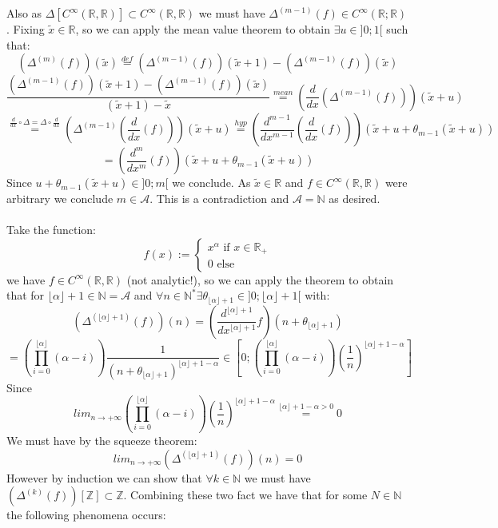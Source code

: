 \documentclass[11pt, a4paper, oneside]{article}
\theoremstyle{remark}
\theoremstyle{lemma}
\begin{document}
Also as $\Delta[C^{\infty}(\mathbb{R},\mathbb{R})]\subset C^{\infty}(\mathbb{R},\mathbb{R})$ we must have $\Delta^{(m-1)}(f)\in C^{\infty}(\mathbb{R};\mathbb{R})$. Fixing $\tilde{x}\in\mathbb{R}$, so we can apply the mean value theorem to obtain $\exists u\in ]0;1[$ such that:
$$\left(\Delta^{(m)}(f)\right)(\tilde{x})\overset{def}{=}\left(\Delta^{(m-1)}(f)\right)(\tilde{x}+1)-\left(\Delta^{(m-1)}(f)\right)(\tilde{x})$$
$$\frac{\left(\Delta^{(m-1)}(f)\right)(\tilde{x}+1)-\left(\Delta^{(m-1)}(f)\right)(\tilde{x})}{(\tilde{x}+1)-\tilde{x}}\overset{mean}{=}\left(\frac{d}{dx}\left(\Delta^{(m-1)}(f)\right)\right)(\tilde{x}+u)$$
$$\overset{\frac{d}{dx}\circ\Delta=\Delta\circ\frac{d}{dx}}{=}\left(\Delta^{(m-1)}\left(\frac{d}{dx}(f)\right)\right)(\tilde{x}+u)\overset{hyp}{=}\left(\frac{d^{m-1}}{dx^{m-1}}\left(\frac{d}{dx}(f)\right)\right)(\tilde{x}+u+\theta_{m-1}(\tilde{x}+u))$$
$$=\left(\frac{d^{m}}{dx^{m}}(f)\right)(\tilde{x}+u+\theta_{m-1}(\tilde{x}+u))$$
Since $u+\theta_{m-1}(\tilde{x}+u)\in]0;m[$ we conclude. As $\tilde{x}\in\mathbb{R}$ and $f\in C^{\infty}(\mathbb{R},\mathbb{R})$ were arbitrary we conclude $m\in\mathcal{A}$. This is a contradiction and $\mathcal{A}=\mathbb{N}$ as desired.
\\\\
Take the function:
$$f(x):=\begin{cases}
x^{\alpha} \text{ if } x\in\mathbb{R}_{+}    \\
0 \text{ else }
\end{cases}
$$
we have $f\in C^{\infty}(\mathbb{R},\mathbb{R})$ (not analytic!), so we can apply the theorem to obtain that for $\lfloor\alpha\rfloor+1\in\mathbb{N}=\mathcal{A}$ and  $\forall n\in\mathbb{N}^{*}\exists\theta_{\lfloor\alpha\rfloor+1}\in]0;\lfloor\alpha\rfloor+1[$ with:
$$\left(\Delta^{(\lfloor\alpha\rfloor+1)}(f)\right)(n)=\left(\frac{d^{\lfloor\alpha\rfloor+1}}{dx^{\lfloor\alpha\rfloor+1}}f\right)(n+\theta_{\lfloor\alpha\rfloor+1})$$
$$=\left(\prod_{i=0}^{\lfloor\alpha\rfloor}(\alpha-i)\right)\frac{1}{(n+\theta_{\lfloor\alpha\rfloor+1})^{\lfloor\alpha\rfloor+1-\alpha}}\in\left[0;\left(\prod_{i=0}^{\lfloor\alpha\rfloor}(\alpha-i)\right)\left(\frac{1}{n}\right)^{\lfloor\alpha\rfloor+1-\alpha}\right]$$
Since $$lim_{n\rightarrow+\infty}\left(\prod_{i=0}^{\lfloor\alpha\rfloor}(\alpha-i)\right)\left(\frac{1}{n}\right)^{\lfloor\alpha\rfloor+1-\alpha}\overset{\lfloor\alpha\rfloor+1-\alpha>0}{=}0$$
We must have by the squeeze theorem:
$$lim_{n\rightarrow+\infty}\left(\Delta^{(\lfloor\alpha\rfloor+1)}(f)\right)(n)=0$$
However by induction we can show that $\forall k\in\mathbb{N}$ we must have $(\Delta^{(k)}(f))[\mathbb{Z}]\subset\mathbb{Z}$. Combining these two fact we have that for some $N\in\mathbb{N}$ the following phenomena occurs:
\end{document}

